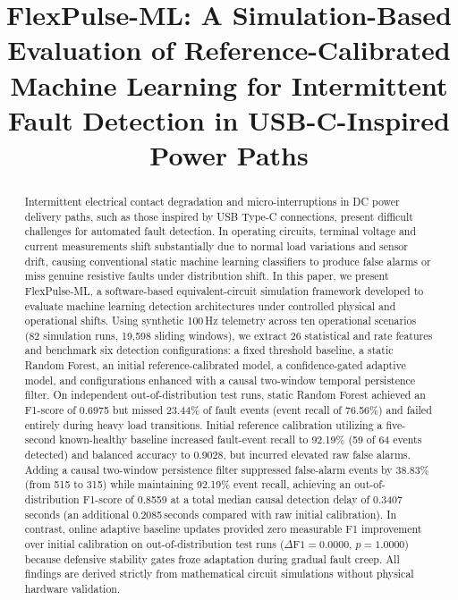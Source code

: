 \documentclass[conference]{IEEEtran}
\begin{document}
\title{FlexPulse-ML: A Simulation-Based Evaluation of Reference-Calibrated Machine Learning for Intermittent Fault Detection in USB-C-Inspired Power Paths}

\author{
}

\maketitle

\begin{abstract}
Intermittent electrical contact degradation and micro-interruptions in DC power delivery paths, such as those inspired by USB Type-C connections, present difficult challenges for automated fault detection. In operating circuits, terminal voltage and current measurements shift substantially due to normal load variations and sensor drift, causing conventional static machine learning classifiers to produce false alarms or miss genuine resistive faults under distribution shift. In this paper, we present FlexPulse-ML, a software-based equivalent-circuit simulation framework developed to evaluate machine learning detection architectures under controlled physical and operational shifts. Using synthetic 100\,Hz telemetry across ten operational scenarios (82 simulation runs, 19,598 sliding windows), we extract 26 statistical and rate features and benchmark six detection configurations: a fixed threshold baseline, a static Random Forest, an initial reference-calibrated model, a confidence-gated adaptive model, and configurations enhanced with a causal two-window temporal persistence filter. On independent out-of-distribution test runs, static Random Forest achieved an F1-score of 0.6975 but missed 23.44\% of fault events (event recall of 76.56\%) and failed entirely during heavy load transitions. Initial reference calibration utilizing a five-second known-healthy baseline increased fault-event recall to 92.19\% (59 of 64 events detected) and balanced accuracy to 0.9028, but incurred elevated raw false alarms. Adding a causal two-window persistence filter suppressed false-alarm events by 38.83\% (from 515 to 315) while maintaining 92.19\% event recall, achieving an out-of-distribution F1-score of 0.8559 at a total median causal detection delay of 0.3407\,seconds (an additional 0.2085\,seconds compared with raw initial calibration). In contrast, online adaptive baseline updates provided zero measurable F1 improvement over initial calibration on out-of-distribution test runs ($\Delta\text{F1} = 0.0000$, $p = 1.0000$) because defensive stability gates froze adaptation during gradual fault creep. All findings are derived strictly from mathematical circuit simulations without physical hardware validation.
\end{abstract}
\end{document}
